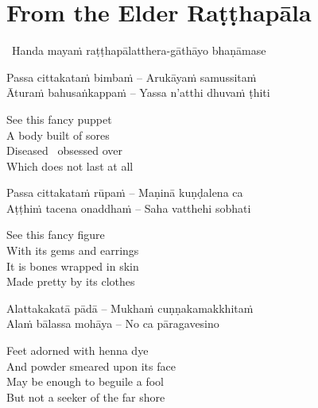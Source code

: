 \suttaRef{[SN 22.22]}


\section{From the Elder Raṭṭhapāla}
\label{ratthapala}

\begin{leader}
  \anglebracketleft\ \hspace{-0.5mm}Handa mayaṁ raṭṭhapālatthera-gāthāyo bhaṇāmase \hspace{-0.5mm}\anglebracketright\
\end{leader}

\begin{verses}
  Passa cittakataṁ bimbaṁ – Arukāyaṁ samussitaṁ\\
  Āturaṁ bahusaṅkappaṁ – Yassa n'atthi dhuvaṁ ṭhiti
\end{verses}

\begin{english-verses}
  See this fancy puppet\\
  A body built of sores\\
  Diseased \breathmark\ obsessed over\\
  Which does not last at all
\end{english-verses}

\begin{verses}
  Passa cittakataṁ rūpaṁ – Maṇinā kuṇḍalena ca\\
  Aṭṭhiṁ tacena onaddhaṁ – Saha vatthehi sobhati
\end{verses}

\begin{english-verses}
  See this fancy figure\\
  With its gems and earrings\\
  It is bones wrapped in skin\\
  Made pretty by its clothes
\end{english-verses}

\begin{verses}
  Alattakakatā pādā – Mukhaṁ cuṇṇakamakkhitaṁ\\
  Alaṁ bālassa mohāya – No ca pāragavesino
\end{verses}

\begin{english-verses}
  Feet adorned with henna dye\\
  And powder smeared upon its face\\
  May be enough to beguile a fool\\
  But not a seeker of the far shore
\end{english-verses}

